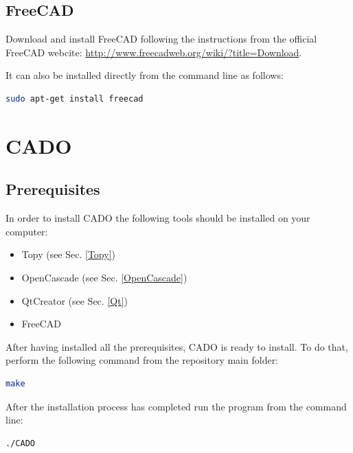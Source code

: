 \documentclass[11pt,a4paper,article,bibtotoc,idxtotoc,headsepline,footsepline,footexclude,DIV13,oneside]{scrbook}
\begin{document}
\section{FreeCAD}
Download and install FreeCAD following the instructions from the official FreeCAD webcite: \href{http://www.freecadweb.org/wiki/?title=Download}{http://www.freecadweb.org/wiki/?title=Download}.

It can also be installed directly from the command line as follows:
\begin{lstlisting}[language=bash]
sudo apt-get install freecad
\end{lstlisting}
\chapter{CADO}
\section{Prerequisites}
In order to install CADO the following tools should be installed on your computer:
\begin{itemize}
	\item Topy (see Sec. \ref{Topy})
	\item OpenCascade (see Sec. \ref{OpenCascade})
	\item QtCreator (see Sec. \ref{Qt})
	\item FreeCAD
	\end{itemize}
After having installed all the prerequisites, CADO is ready to install. To do that, perform the following command from the repository main folder:
\begin{lstlisting}[language=bash]
make
\end{lstlisting}	
After the installation process has completed run the program from the command line:
\begin{lstlisting}[language=bash]
./CADO
\end{lstlisting}	


  	\clearemptydoublepage
	
 
\end{document}
